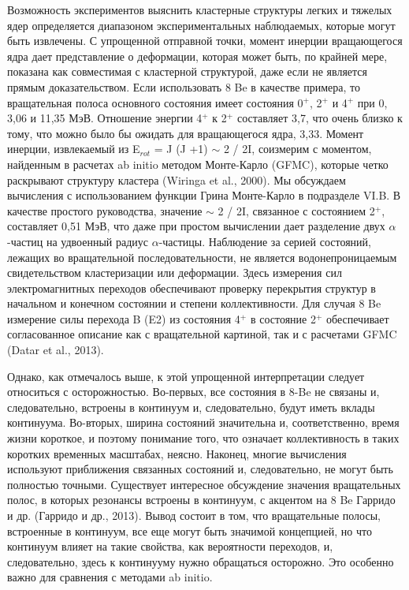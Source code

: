 \documentclass[fontsize=14pt]{scrarticle}
\begin{document}
Возможность экспериментов выяснить кластерные структуры легких и тяжелых ядер определяется диапазоном экспериментальных наблюдаемых, которые могут быть извлечены. С упрощенной отправной точки, момент инерции вращающегося ядра дает представление о деформации, которая может быть, по крайней мере, показана как совместимая с кластерной структурой, даже если не является прямым доказательством. Если использовать 8 Be в качестве примера, то вращательная полоса основного состояния имеет состояния 0$^{+}$, 2$^{+}$ и 4$^{+}$ при 0, 3,06 и 11,35 МэВ. Отношение энергии 4$^{+}$ к 2$^{+}$ составляет 3,7, что очень близко к тому, что можно было бы ожидать для вращающегося ядра, 3,33. Момент инерции, извлекаемый из E$_{rot}$ = J (J +1) $\sim$ 2 / 2I, соизмерим с моментом, найденным в расчетах ab initio методом Монте-Карло (GFMC), которые четко раскрывают структуру кластера (Wiringa et al., 2000). Мы обсуждаем вычисления с использованием функции Грина Монте-Карло в подразделе VI.B. В качестве простого руководства, значение $\sim$ 2 / 2I, связанное с состоянием 2$^{+}$, составляет 0,51 МэВ, что даже при простом вычислении дает разделение двух $\alpha$-частиц на удвоенный радиус $\alpha$-частицы. Наблюдение за серией состояний, лежащих во вращательной последовательности, не является водонепроницаемым свидетельством кластеризации или деформации. Здесь измерения сил электромагнитных переходов обеспечивают проверку перекрытия структур в начальном и конечном состоянии и степени коллективности. Для случая 8 Be измерение силы перехода B (E2) из состояния 4$^{+}$ в состояние 2$^{+}$ обеспечивает согласованное описание как с вращательной картиной, так и с расчетами GFMC (Datar et al., 2013).

Однако, как отмечалось выше, к этой упрощенной интерпретации следует относиться с осторожностью. Во-первых, все состояния в 8-Be не связаны и, следовательно, встроены в континуум и, следовательно, будут иметь вклады континуума. Во-вторых, ширина состояний значительна и, соответственно, время жизни короткое, и поэтому понимание того, что означает коллективность в таких коротких временных масштабах, неясно. Наконец, многие вычисления используют приближения связанных состояний и, следовательно, не могут быть полностью точными. Существует интересное обсуждение значения вращательных полос, в которых резонансы встроены в континуум, с акцентом на 8 Be Гарридо и др. (Гарридо и др., 2013). Вывод состоит в том, что вращательные полосы, встроенные в континуум, все еще могут быть значимой концепцией, но что континуум влияет на такие свойства, как вероятности переходов, и, следовательно, здесь к континууму нужно обращаться осторожно. Это особенно важно для сравнения с методами ab initio.
\end{document}
